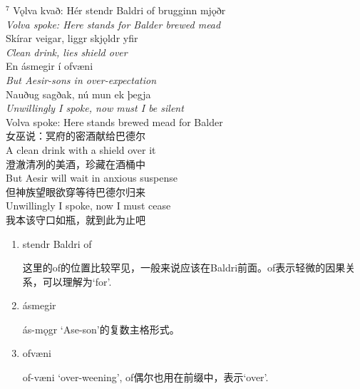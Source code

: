\begin{paracol}{2}
  \noindent
  $^7$ Vǫlva kvað: Hér stendr Baldri of brugginn mjǫðr\\
  \textit{Volva spoke: Here stands for Balder brewed mead}\\
  Skírar veigar, liggr skjǫldr yfir\\
  \textit{Clean drink, lies shield over}\\
  En ásmegir í ofvæni\\
  \textit{But Aesir-sons in over-expectation}\\
  Nauðug sagðak, nú mun ek þegja\\
  \textit{Unwillingly I spoke, now must I be silent}\\
  \switchcolumn
  \noindent
  Volva spoke: Here stands brewed mead for Balder\\
  女巫说：冥府的密酒献给巴德尔\\
  A clean drink with a shield over it\\
  澄澈清冽的美酒，珍藏在酒桶中\\
  But Aesir will wait in anxious suspense\\
  但神族望眼欲穿等待巴德尔归来\\
  Unwillingly I spoke, now I must cease\\
  我本该守口如瓶，就到此为止吧
\end{paracol}
\begin{grammar*}{}
  \begin{enumerate}[leftmargin=*]
    \item stendr Baldri of

          这里的of的位置比较罕见，一般来说应该在Baldri前面。of表示轻微的因果关系，可以理解为`for'.

    \item ásmegir

          ás-mǫgr `Ase-son'的复数主格形式。
    \item ofvæni

          of-væni `over-weening', of偶尔也用在前缀中，表示`over'.
  \end{enumerate}
\end{grammar*}
